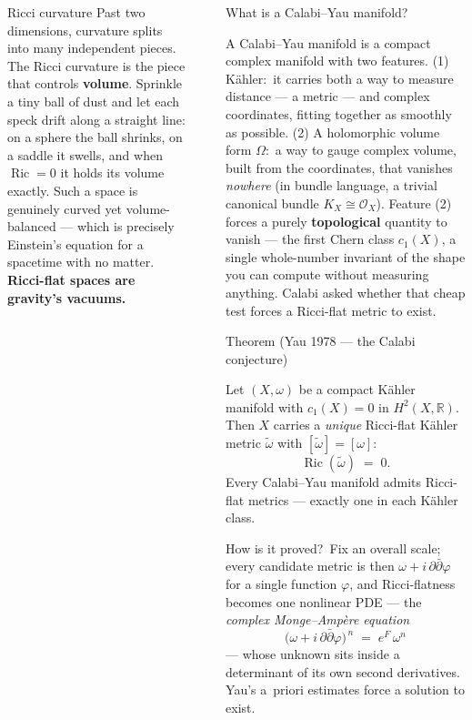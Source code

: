 \documentclass[final]{beamer}
\newlength{\sepwidth}
\newlength{\colwidth}
\newcommand{\separatorcolumn}{\begin{column}{\sepwidth}\end{column}}
\newcommand{\auterm}[1]{{\AUsemibold\color{AUblue}#1}}
\begin{document}
\begin{frame}[t]
\begin{columns}[t]
\begin{column}{\colwidth}
\begin{block}{Ricci curvature}
    Past two dimensions, curvature splits into many independent pieces. The
    \auterm{Ricci curvature} is the piece that controls \textbf{volume}.
    Sprinkle a tiny ball of dust and let each speck drift along a straight
    line: on a sphere the ball shrinks, on a saddle it swells, and when
    $\operatorname{Ric}=0$ it holds its volume exactly. Such a space is
    genuinely curved yet volume-balanced --- which is precisely Einstein's
    equation for a spacetime with no matter. \textbf{Ricci-flat spaces are
    gravity's vacuums.}

  \end{block}

\end{column}

\separatorcolumn

\begin{column}{\colwidth}

  \begin{block}{What is a Calabi--Yau manifold?}

    A \auterm{Calabi--Yau manifold} is a compact complex manifold with two
    features. \auterm{(1) K\"ahler:}\ it carries both a way to measure
    distance --- a metric --- and complex coordinates, fitting together as
    smoothly as possible. \auterm{(2) A holomorphic volume form} $\Omega$:\
    a way to gauge complex volume, built from the coordinates, that vanishes
    \emph{nowhere} (in bundle language, a trivial canonical bundle
    $K_X \cong \mathcal{O}_X$). Feature (2) forces a purely
    \textbf{topological} quantity to vanish --- the \auterm{first Chern class}
    $c_1(X)$, a single whole-number invariant of the shape you can compute
    without measuring anything. Calabi asked whether that cheap test forces a
    Ricci-flat metric to exist.

  \end{block}

  \begin{alertblock}{Theorem (Yau 1978 --- the Calabi conjecture)}

    Let $(X,\omega)$ be a compact K\"ahler manifold with $c_1(X)=0$ in
    $H^2(X,\mathbb{R})$. Then $X$ carries a \emph{unique} Ricci-flat
    K\"ahler metric $\tilde\omega$ with $[\tilde\omega]=[\omega]$:
    \[
      \operatorname{Ric}(\tilde\omega) \;=\; 0 .
    \]
    Every Calabi--Yau manifold admits Ricci-flat metrics --- exactly one in
    each K\"ahler class.

    \auterm{How is it proved?}\ Fix an overall scale; every candidate metric
    is then $\omega + i\,\partial\bar\partial\varphi$ for a single function
    $\varphi$, and Ricci-flatness becomes one nonlinear PDE --- the
    \emph{complex Monge--Amp\`ere equation}
    \[
      \bigl(\omega + i\,\partial\bar\partial\varphi\bigr)^{\,n}
      \;=\; e^{F}\,\omega^{n}
    \]
    --- whose unknown sits inside a determinant of its own second
    derivatives. Yau's a~priori estimates force a solution to exist.


\end{alertblock}
\end{column}
\end{columns}
\end{frame}
\end{document}
